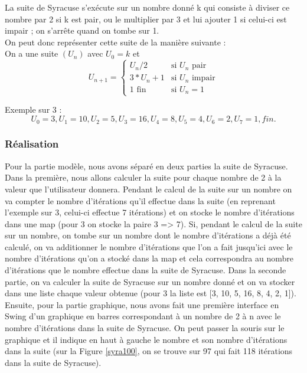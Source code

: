 La suite de Syracuse s'exécute sur un nombre donné k qui consiste à diviser ce nombre par 2 si k est pair, ou le multiplier par 3 et lui ajouter 1 si celui-ci est impair ; on s'arrête quand on tombe sur 1. \\
On peut donc représenter cette suite de la manière suivante : \\ 

On a une suite $(U_n)$ avec $U_0 = k$ et 
$$
U_{n+1} = \left\{
    \begin{array}{ll}
        U_n/2 & \mbox{si } U_n \mbox{ pair} \\
        3*U_n + 1 & \mbox{si } U_n \mbox{ impair} \\
        1 \mbox{ fin} & \mbox{si } U_n = 1
    \end{array}
\right.
$$

Exemple sur 3 :
$$
U_0 = 3, U_1 = 10, U_2 = 5, U_3 = 16, U_4 = 8, U_5 = 4, U_6 = 2, U_7 = 1, fin.
$$

\subsubsection{Réalisation}
Pour la partie modèle, nous avons séparé en deux parties la suite de Syracuse. Dans la première, nous allons calculer la suite pour chaque nombre de 2 à la valeur que l'utilisateur donnera. Pendant le calcul de la suite sur un nombre on va compter le nombre d'itérations qu'il effectue dans la suite (en reprenant l'exemple sur 3, celui-ci effectue 7 itérations) et on stocke le nombre d'itérations dans une map (pour 3 on stocke la paire {3 => 7}). Si, pendant le calcul de la suite sur un nombre, on tombe sur un nombre dont le nombre d'itérations a déjà été calculé, on va additionner le nombre d'itérations que l'on a fait jusqu'ici avec le nombre d'itérations qu'on a stocké dans la map et cela correspondra au nombre d'itérations que le nombre effectue dans la suite de Syracuse. Dans la seconde partie, on va calculer la suite de Syracuse sur un nombre donné et on va stocker dans une liste chaque valeur obtenue (pour 3 la liste est [3, 10, 5, 16, 8, 4, 2, 1]).\\

Ensuite, pour la partie graphique, nous avons fait une première interface en Swing d'un graphique en barres correspondant à un nombre de 2 à n avec le nombre d'itérations dans la suite de Syracuse. On peut passer la souris sur le graphique et il indique en haut à gauche le nombre et son nombre d'itérations dans la suite (sur la Figure \ref{syra100}, on se trouve sur 97 qui fait 118 itérations dans la suite de Syracuse).

